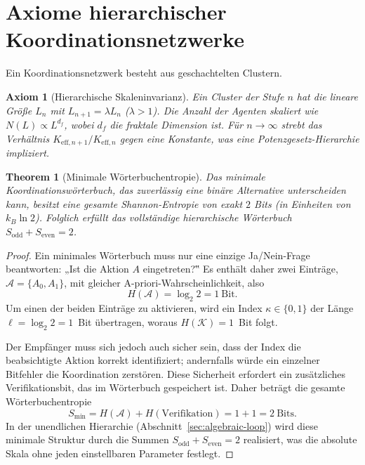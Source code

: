 \documentclass[12pt,a4paper]{article}
\newtheorem{axiom}{Axiom}
\newtheorem{theorem}{Theorem}[section]
\begin{document}
	\section{Axiome hierarchischer Koordinationsnetzwerke}
	
	Ein Koordinationsnetzwerk besteht aus geschachtelten Clustern.
	
	\begin{axiom}[Hierarchische Skaleninvarianz] \label{ax:A1}
		Ein Cluster der Stufe \(n\) hat die lineare Größe \(L_n\) mit \(L_{n+1} = \lambda L_n\) (\(\lambda > 1\)).  Die Anzahl der Agenten skaliert wie \(N(L) \propto L^{d_f}\), wobei \(d_f\) die fraktale Dimension ist.  Für \(n \to \infty\) strebt das Verhältnis \(K_{\mathrm{eff},n+1}/K_{\mathrm{eff},n}\) gegen eine Konstante, was eine Potenzgesetz-Hierarchie impliziert.
	\end{axiom}
	
	\begin{theorem}[Minimale Wörterbuchentropie]
		\label{thm:minimal-dict}
		Das minimale Koordinationswörterbuch, das zuverlässig eine binäre Alternative unterscheiden kann, besitzt eine gesamte Shannon-Entropie von exakt \(2\) Bits (in Einheiten von \(k_B\ln 2\)).  Folglich erfüllt das vollständige hierarchische Wörterbuch \(S_{\mathrm{odd}} + S_{\mathrm{even}} = 2\).
	\end{theorem}
	
	\begin{proof}
		Ein minimales Wörterbuch muss nur eine einzige Ja/Nein-Frage beantworten: „Ist die Aktion \(A\) eingetreten?‟  Es enthält daher zwei Einträge, \(\mathcal{A} = \{A_0, A_1\}\), mit gleicher A-priori-Wahrscheinlichkeit, also
		\[
		H(\mathcal{A}) = \log_2 2 = 1\ \text{Bit}.
		\]
		Um einen der beiden Einträge zu aktivieren, wird ein Index \(\kappa \in \{0,1\}\) der Länge \(\ell = \log_2 2 = 1\)~Bit übertragen, woraus \(H(\mathcal{K}) = 1\)~Bit folgt.
		
		Der Empfänger muss sich jedoch auch sicher sein, dass der Index die beabsichtigte Aktion korrekt identifiziert; andernfalls würde ein einzelner Bitfehler die Koordination zerstören.  Diese Sicherheit erfordert ein zusätzliches Verifikationsbit, das im Wörterbuch gespeichert ist.  Daher beträgt die gesamte Wörterbuchentropie
		\[
		S_{\min} = H(\mathcal{A}) + H(\text{Verifikation}) = 1 + 1 = 2\ \text{Bits}.
		\]
		In der unendlichen Hierarchie (Abschnitt~\ref{sec:algebraic-loop}) wird diese minimale Struktur durch die Summen \(S_{\mathrm{odd}} + S_{\mathrm{even}} = 2\) realisiert, was die absolute Skala ohne jeden einstellbaren Parameter festlegt.
	\end{proof}
	
\end{document}
